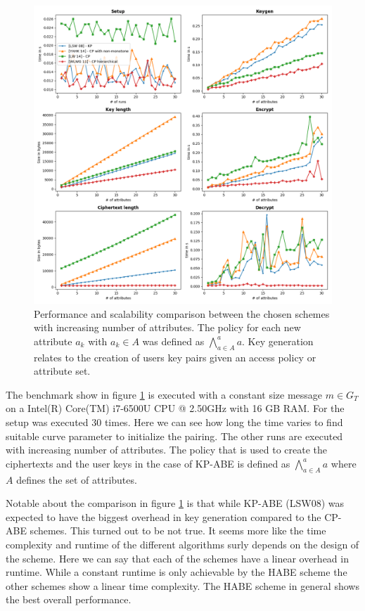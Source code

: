 \begin{figure}[!ht]
\centering
    \includegraphics[width=1\linewidth]{img/basic_abe_comparisons.png}
    \caption{Performance and scalability comparison between the chosen schemes with increasing number of attributes. The policy for each new attribute $a_k$ with $a_k \in A$ was defined as $\bigwedge\limits_{a \in A}^a a$. Key generation relates to the creation of users key pairs given an access policy or attribute set.}
    \label{fig:basic_abe_comparison}
\end{figure}

The  benchmark show in figure \ref{fig:basic_abe_comparison} is executed with a constant size message $m \in G_T$ on a Intel(R) Core(TM) i7-6500U CPU @ 2.50GHz with 16 GB RAM. For the setup was executed 30 times. Here we can see how long the time varies to find suitable curve parameter to initialize the pairing. The other runs are executed with increasing number of attributes. The policy that is used to create the ciphertexts and the user keys in the case of KP-ABE is defined as $\bigwedge\limits_{a \in A}^a a$ where $A$ defines the set of attributes. 

Notable about the comparison in figure \ref{fig:basic_abe_comparison} is that while \ac{KP-ABE} (LSW08) was expected to have the biggest overhead in key generation compared to the \ac{CP-ABE} schemes. This turned out to be not true. It seems more like the time complexity and runtime of the different algorithms surly depends on the design of the scheme. Here we can say that each of the schemes have a linear overhead in runtime. While a constant runtime is only achievable by the HABE scheme the other schemes show a linear time complexity. The HABE scheme in general shows the best overall performance. 

